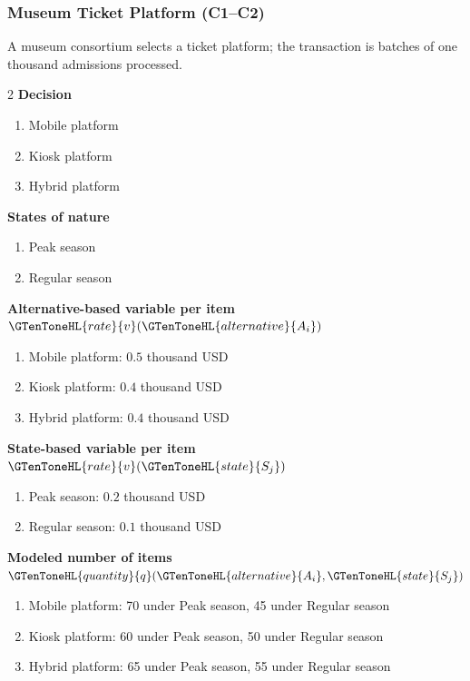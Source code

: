 	\subsubsection{Museum Ticket Platform (C1--C2)}
	\label{sec:problem15-museum-ticket-platform-c1-c2}
	A museum consortium selects a ticket platform; the transaction is batches of one thousand admissions processed.
	\begin{multicols}{2}
	\textbf{Decision }
	\begin{enumerate}[label=\arabic*.]
\item Mobile platform
\item Kiosk platform
\item Hybrid platform
	\end{enumerate}
	\textbf{States of nature}
	\begin{enumerate}[label=\arabic*.]
\item Peak season
\item Regular season
	\end{enumerate}
	\columnbreak
	\textbf{Alternative-based variable  per item $\GTenToneHL{rate}{v}(\GTenToneHL{alternative}{A_i})$}
\begin{enumerate}[label=\arabic*.]
\item Mobile platform: $0.5$ thousand USD
\item Kiosk platform: $0.4$ thousand USD
\item Hybrid platform: $0.4$ thousand USD\end{enumerate}
\textbf{State-based variable  per item $\GTenToneHL{rate}{v}(\GTenToneHL{state}{S_j})$}
\begin{enumerate}[label=\arabic*.]
\item Peak season: $0.2$ thousand USD
\item Regular season: $0.1$ thousand USD\end{enumerate}
\textbf{Modeled number of items $\GTenToneHL{quantity}{q}(\GTenToneHL{alternative}{A_i},\GTenToneHL{state}{S_j})$}
\begin{enumerate}[label=\arabic*.]
\item Mobile platform: 70 under Peak season, 45 under Regular season
\item Kiosk platform: 60 under Peak season, 50 under Regular season
\item Hybrid platform: 65 under Peak season, 55 under Regular season
\end{enumerate}
	\end{multicols}

